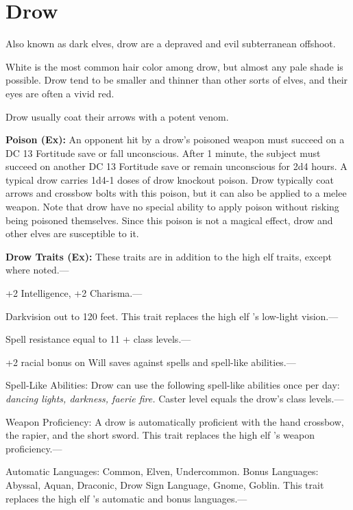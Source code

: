 \documentclass{article}
\begin{document}
\vspace{12pt}
\section*{\textbf{Drow}}

Also known as dark elves, drow are a depraved and evil subterranean offshoot.

White is the most common hair color among drow, but almost any pale shade is possible. 
Drow tend to be smaller and thinner than other sorts of elves, and their eyes are 
often a vivid red. 

Drow usually coat their arrows with a potent venom.

\textbf{Poison (Ex):} An opponent hit by a drow's poisoned weapon must succeed 
on a DC 13 Fortitude save or fall unconscious. After 1 minute, the subject must 
succeed on another DC 13 Fortitude save or remain unconscious for 2d4 hours. A 
typical drow carries 1d4-1 doses of drow knockout poison. Drow typically coat arrows 
and crossbow bolts with this poison, but it can also be applied to a melee weapon. 
Note that drow have no special ability to apply poison without risking being poisoned 
themselves. Since this poison is not a magical effect, drow and other elves are 
susceptible to it.

\textbf{Drow Traits (Ex):} These traits are in addition to the high elf traits, 
except where noted.--- 

\parindent=3pt
+2 Intelligence, +2 Charisma.---

\parindent=0pt
Darkvision out to 120 feet. This trait replaces the high elf 's low-light vision.---

Spell resistance equal to 11 + class levels.--- 

\parindent=3pt
+2 racial bonus on Will saves against spells and spell-like abilities.---

\parindent=0pt
Spell-Like Abilities: Drow can use the following spell-like abilities once per 
day: \textit{dancing lights, darkness, faerie fire. }Caster level equals the drow's 
class levels.---

Weapon Proficiency: A drow is automatically proficient with the hand crossbow, 
the rapier, and the short sword. This trait replaces the high elf 's weapon proficiency.---

Automatic Languages: Common, Elven, Undercommon. Bonus Languages: Abyssal, Aquan, 
Draconic, Drow Sign Language, Gnome, Goblin. This trait replaces the high elf 's 
automatic and bonus languages.---
\end{document}
